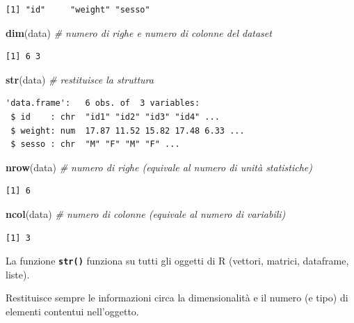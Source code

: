\documentclass[
  a4paper,
  DIV=11,
  numbers=noendperiod]{scrreprt}
\newenvironment{Shaded}{\begin{snugshade}}{\end{snugshade}}
\newcommand{\CommentTok}[1]{\textcolor[rgb]{0.56,0.35,0.01}{\textit{#1}}}
\newcommand{\FunctionTok}[1]{\textcolor[rgb]{0.13,0.29,0.53}{\textbf{#1}}}
\newcommand{\NormalTok}[1]{#1}
\begin{document}
\begin{verbatim}
[1] "id"     "weight" "sesso" 
\end{verbatim}

\begin{Shaded}
\begin{Highlighting}[]
\FunctionTok{dim}\NormalTok{(data) }\CommentTok{\# numero di righe e numero di colonne del dataset}
\end{Highlighting}
\end{Shaded}

\begin{verbatim}
[1] 6 3
\end{verbatim}

\begin{Shaded}
\begin{Highlighting}[]
\FunctionTok{str}\NormalTok{(data) }\CommentTok{\# restituisce la struttura }
\end{Highlighting}
\end{Shaded}

\begin{verbatim}
'data.frame':   6 obs. of  3 variables:
 $ id    : chr  "id1" "id2" "id3" "id4" ...
 $ weight: num  17.87 11.52 15.82 17.48 6.33 ...
 $ sesso : chr  "M" "F" "M" "F" ...
\end{verbatim}

\begin{Shaded}
\begin{Highlighting}[]
\FunctionTok{nrow}\NormalTok{(data) }\CommentTok{\# numero di righe (equivale al numero di unità statistiche)}
\end{Highlighting}
\end{Shaded}

\begin{verbatim}
[1] 6
\end{verbatim}

\begin{Shaded}
\begin{Highlighting}[]
\FunctionTok{ncol}\NormalTok{(data) }\CommentTok{\# numero di colonne (equivale al numero di variabili)}
\end{Highlighting}
\end{Shaded}

\begin{verbatim}
[1] 3
\end{verbatim}

\begin{tcolorbox}[enhanced jigsaw, toprule=.15mm, left=2mm, leftrule=.75mm, breakable, coltitle=black, title={NB}, bottomtitle=1mm, opacitybacktitle=0.6, toptitle=1mm, titlerule=0mm, bottomrule=.15mm, colframe=quarto-callout-note-color-frame, arc=.35mm, rightrule=.15mm, opacityback=0, colbacktitle=quarto-callout-note-color!10!white, colback=white]

La funzione \textbf{\texttt{str()}} funziona su tutti gli oggetti di R
(vettori, matrici, dataframe, liste).

Restituisce sempre le informazioni circa la dimensionalità e il numero
(e tipo) di elementi contentui nell'oggetto.

\end{tcolorbox}
\end{document}
